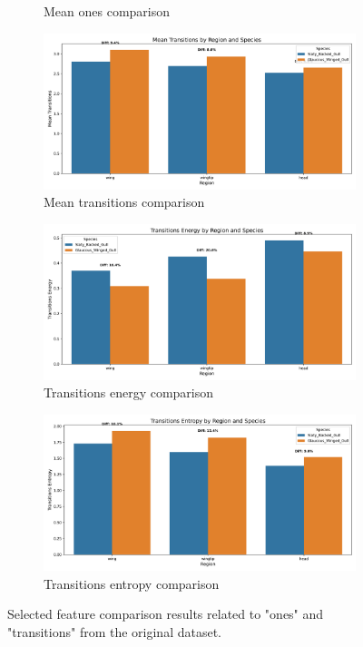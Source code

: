\documentclass[a4paper,12pt]{report}
\begin{document}
\begin{figure}[H]
\begin{subfigure}[b]{0.48\textwidth}
        \caption{Mean ones comparison}
    \end{subfigure}
    \hfill
    \begin{subfigure}[b]{0.48\textwidth}
        \includegraphics[width=\textwidth]{images/appendix/Original/mean_transitions_comparison.png}
        \caption{Mean transitions comparison}
    \end{subfigure}
    \vspace{0.5cm}
    \begin{subfigure}[b]{0.48\textwidth}
        \includegraphics[width=\textwidth]{images/appendix/Original/transitions_energy_comparison.png}
        \caption{Transitions energy comparison}
    \end{subfigure}
    \hfill
    \begin{subfigure}[b]{0.48\textwidth}
        \includegraphics[width=\textwidth]{images/appendix/Original/transitions_entropy_comparison.png}
        \caption{Transitions entropy comparison}
    \end{subfigure}
    \caption{Selected feature comparison results related to "ones" and "transitions" from the original dataset.}
\end{figure}
\end{document}
